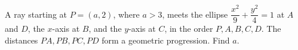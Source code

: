 A ray starting at $P=(a,2)$, where $a>3$, meets the ellipse $\dfrac{x^2}{9}+\dfrac{y^2}{4}=1$ at $A$ and $D$, the $x$-axis at $B$, and the $y$-axis at $C$, in the order $P,A,B,C,D$. The distances $PA,PB,PC,PD$ form a geometric progression. Find $a$.
